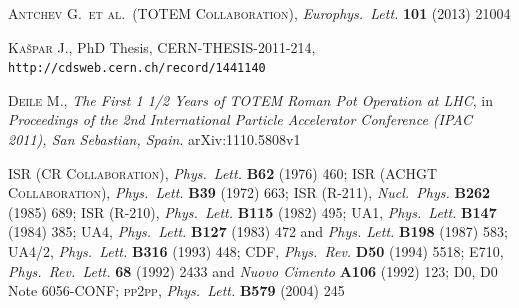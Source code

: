 \documentclass[TOTEM]{cern/cernphprep}
\def\etal{et al.}
\def\Name#1{\textsc{#1}, }
\def\REVIEW#1#2#3#4{{\it #1} {\bf #2} (#3) #4}
\begin{document}
\begin{thebibliography}{99}
	\Name{Antchev G.~\etal{}~(TOTEM Collaboration)}
	\REVIEW{Europhys.~Lett.}{101}{2013}{21004}

	\Name{Ka\v spar J.}
	PhD Thesis, CERN-THESIS-2011-214, {\tt http://cdsweb.cern.ch/record/1441140}

	\Name{Deile M.}
	{\it The First 1 1/2 Years of TOTEM Roman Pot Operation at LHC}, in
	{\it Proceedings of the 2nd International Particle Accelerator Conference (IPAC 2011), San Sebastian, Spain}. 
	arXiv:1110.5808v1


	\Name{ISR (CR Collaboration)} \REVIEW{Phys.~Lett.}{B62}{1976}{460}; 
	\Name{ISR (ACHGT Collaboration)} \REVIEW{Phys.~Lett.}{B39}{1972}{663}; 
	\Name{ISR (R-211)} \REVIEW{Nucl.~Phys.}{B262}{1985}{689}; 
	\Name{ISR (R-210)} \REVIEW{Phys.~Lett.}{B115}{1982}{495}; 
	\Name{UA1} \REVIEW{Phys.~Lett.}{B147}{1984}{385}; 
	\Name{UA4} \REVIEW{Phys.~Lett.}{B127}{1983}{472} and \REVIEW{Phys. Lett.}{B198}{1987}{583}; 
	\Name{UA4/2} \REVIEW{Phys.~Lett.}{B316}{1993}{448}; 
	\Name{CDF} \REVIEW{Phys.~Rev.}{D50}{1994}{5518}; 
	\Name{E710} \REVIEW{Phys.~Rev.~Lett.}{68}{1992}{2433} and \REVIEW{Nuovo Cimento}{A106}{1992}{123}; 
	\Name{D0} D0 Note 6056-CONF; 
	\Name{pp2pp} \REVIEW{Phys.~Lett.}{B579}{2004}{245}

\fi

\end{thebibliography}
\end{document}
